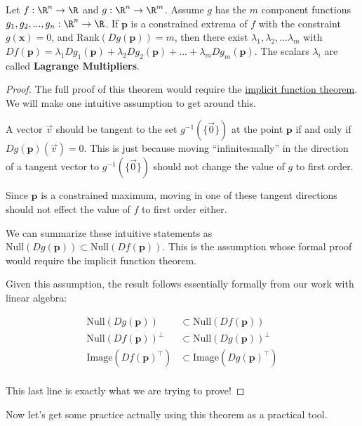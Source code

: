 \documentclass{ximera}
\begin{document}
	\begin{theorem}
		Let $f:\R^n \to \R$ and $g:\R^n \to \R^m$. Assume $g$ has the $m$ component functions $g_1,g_2,...,g_n:\R^n \to \R$. If $\mathbf{p}$ is a constrained extrema of $f$ with the constraint $g(\mathbf{x}) = 0$, 
		and $\textrm{Rank}(Dg(\mathbf{p})) = m$, then there exist $\lambda_1,\lambda_2,...\lambda_m$ with 
		$Df(\mathbf{p}) = \lambda_1Dg_1(\mathbf{p})+ \lambda_2Dg_2(\mathbf{p})+...+\lambda_mDg_m(\mathbf{p})$.  The scalars $\lambda_i$ are
		called \textbf{Lagrange Multipliers}.
	\end{theorem}
	
	\begin{proof}
			The full proof of this theorem would require the \href{http://en.wikipedia.org/wiki/Implicit_function_theorem}{implicit function theorem}.  We will 
			make one intuitive assumption to get around this.
			
			A vector  $\vec{v}$ should be  tangent to the set $g^{-1}(\{\vec{0}\})$ at the point $\mathbf{p}$  if and only if 
			$Dg(\mathbf{p})(\vec{v}) = 0$.  This is just because moving ``infinitesmally'' in the direction of a tangent vector to 
			$g^{-1}(\{\vec{0}\})$ should not change the value of $g$ to first order.  
			
			Since $\mathbf{p}$ is a constrained maximum, moving in one of these tangent directions should not effect the value of $f$ to first order either.
			
			We can summarize these intuitive statements as $\textrm{Null}(Dg(\mathbf{p})) \subset \textrm{Null}(Df(\mathbf{p}))$.  This is the assumption whose
			formal proof would require the implicit function theorem.
			
			Given this assumption, the result follows essentially formally from our work with linear algebra:
			
			\begin{align*}
				\textrm{Null}(Dg(\mathbf{p})) &\subset \textrm{Null}(Df(\mathbf{p}))\\
				\textrm{Null}(Df(\mathbf{p}))^\perp &\subset \textrm{Null}(Dg(\mathbf{p}))^\perp\\
				\textrm{Image}(Df(\mathbf{p})^\top) &\subset \textrm{Image}(Dg(\mathbf{p})^\top)\\
			\end{align*}
			
			This last line is exactly what we are trying to prove!
		\end{proof}
		
	Now let's get some practice actually using this theorem as a practical tool.
\end{document}
